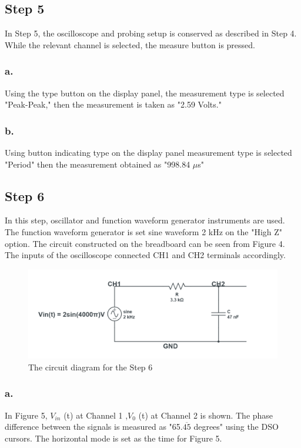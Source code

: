 \documentclass[letterpaper,12pt]{article}
\begin{document}
\subsection{Step 5}
In Step 5, the oscilloscope and probing setup is conserved as described in Step 4. While the relevant channel is selected, the measure button is pressed.
\subsubsection{a.}
Using the type  button on the display panel, the measurement type is selected "Peak-Peak," then the measurement is taken as "2.59 Volts."
\subsubsection{b.}
Using button indicating type on the display panel measurement type is selected "Period" then the measurement obtained as "998.84 \(\mu\)s"
\subsection{Step 6}
In this step, oscillator and function waveform generator instruments are used. The function waveform generator is set sine waveform 2 kHz on the "High Z" option. The circuit constructed on the breadboard can be seen from Figure 4. The inputs of the oscilloscope connected CH1 and CH2 terminals accordingly.
\begin{figure}[H]
	\caption{The circuit diagram for the Step 6}
	\centering
	\includegraphics[width=1\textwidth]{6circuit.png}
\end{figure}

\subsubsection{a.}
In Figure 5, \( V_{in}\) (t) at Channel 1 ,\( V_0 \) (t) at Channel 2 is shown. The phase difference between the signals is measured as "65.\(\overline{45}\)  degrees" using the DSO cursors. The horizontal mode is set as the time for Figure 5.
\end{document}
